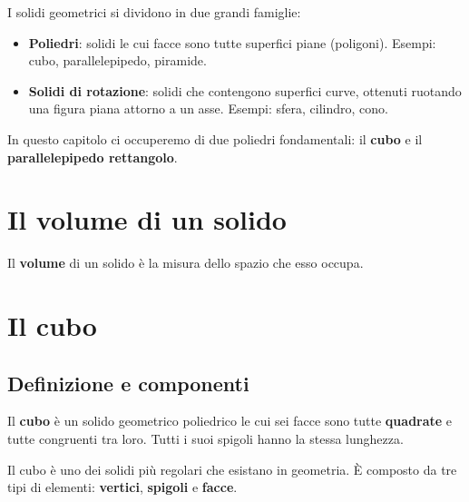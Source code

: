 I solidi geometrici si dividono in due grandi famiglie:

\begin{itemize}[leftmargin=1.4em]
    \item \textbf{Poliedri}: solidi le cui facce sono tutte superfici piane (poligoni). Esempi: cubo, parallelepipedo, piramide.
    \item \textbf{Solidi di rotazione}: solidi che contengono superfici curve, ottenuti ruotando una figura piana attorno a un asse. Esempi: sfera, cilindro, cono.
\end{itemize}

In questo capitolo ci occuperemo di due poliedri fondamentali: il \textbf{cubo} e il \textbf{parallelepipedo rettangolo}.

\section{Il volume di un solido}

\begin{definizione}
    Il \textbf{volume} di un solido è la misura dello spazio che esso occupa.
\end{definizione}

\section{Il cubo}

\subsection{Definizione e componenti}

\begin{definizione}
    Il \textbf{cubo} è un solido geometrico poliedrico le cui sei facce sono tutte \textbf{quadrate} e tutte congruenti tra loro. Tutti i suoi spigoli hanno la stessa lunghezza.
\end{definizione}

Il cubo è uno dei solidi più regolari che esistano in geometria. È composto da tre tipi di elementi: \textbf{vertici}, \textbf{spigoli} e \textbf{facce}.

